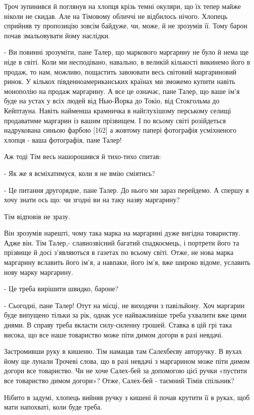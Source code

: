 Троч зупинився й поглянув на хлопця крізь темні окуляри, що їх тепер майже ніколи не скидав. Але на Тімовому обличчі не відбилось нічого. Хлопець сприйняв ту пропозицію зовсім байдуже, чи, може, й не зрозумів її. Тому барон почав змальовувати йому наслідки.

- Ви повинні зрозуміти, пане Талер, що маркового маргарину не було й нема ще ніде в світі. Коли ми несподівано, навально, в великій кількості викинемо його в продаж, то нам, можливо, пощастить завоювати весь світовий маргариновий ринок. У кількох південноамериканських країнах ми зможемо купити навіть монополію на продаж маргарину. А все це означає, пане Талер, що ваше ім'я буде на устах у всіх людей від Нью-Йорка до Токіо, від Стокгольма до Кейптауна. Навіть найменша крамничка в найглухішому перському селищі продаватиме маргарин із вашим прізвищем. І по всьому світі розійдеться надрукована синьою фарбою [162] а жовтому папері фотографія усміхненого хлопця - ваша фотографія, пане Талер!

Аж тоді Тім весь нашорошився й тихо-тихо спитав:

- Як же я всміхатимуся, коли я не вмію сміятись?

- Це питання другорядне, пане Талер. До нього ми зараз перейдемо. А спершу я хочу знати ось що: чи згодні ви на таку назву маргарину?

Тім відповів не зразу.

Він зрозумів нарешті, чому така марка на маргарині дуже вигідна товариству. Адже він. Тім Талер,- славнозвісний багатий спадкоємець, і портрети його та прізвище й досі з'являються в газетах по всьому світі. Отже, не нова марка маргарину вславить його ім'я, а навпаки, його ім'я, вже широко відоме, уславить нову марку маргарину.

- Це треба вирішити швидко, бароне?

- Сьогодні, пане Талер! Отут на місці, не виходячи з павільйону. Хоч маргарин буде випущено тільки за рік, однак усе найважливіше треба ухвалити вже цими днями. В справу треба вкласти силу-силенну грошей. Ставка в цій грі така висока, що все наше товариство може піти димом догори в разі невдачі.

Застромивши руку в кишеню. Тім намацав там Салехбеєву авторучку. В вухах йому ще лунали Трочеві слова, що в разі невдачі з маргарином може піти димом догори все товариство. Чи не хоче Салех-бей за допомогою цієї ручки «пустити все товариство димом догори»? Отже, Салех-бей - таємний Тімів спільник?

Нібито в задумі, хлопець вийняв ручку з кишені й почав крутити її в руках, щоб мати напохваті, коли буде треба.

